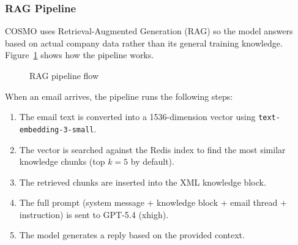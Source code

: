 \documentclass[a4paper]{article}
\begin{document}
\subsubsection{RAG Pipeline}
\label{sec:rag-pipeline}
COSMO uses Retrieval-Augmented Generation (RAG) so the model answers based on
actual company data rather than its general training knowledge.
Figure~\ref{fig:rag-pipeline} shows how the pipeline works.

\begin{figure}[H]
\centering
{}
\caption{RAG pipeline flow}
\label{fig:rag-pipeline}
\end{figure}

\noindent When an email arrives, the pipeline runs the following steps:
\begin{enumerate}
  \item The email text is converted into a 1536-dimension vector using
        \texttt{text-embedding-3-small}.
  \item The vector is searched against the Redis index to find the most
        similar knowledge chunks (top $k = 5$ by default).
  \item The retrieved chunks are inserted into the XML knowledge block.
  \item The full prompt (system message + knowledge block + email thread +
        instruction) is sent to GPT-5.4 (xhigh).
  \item The model generates a reply based on the provided context.
\end{enumerate}
\end{document}

